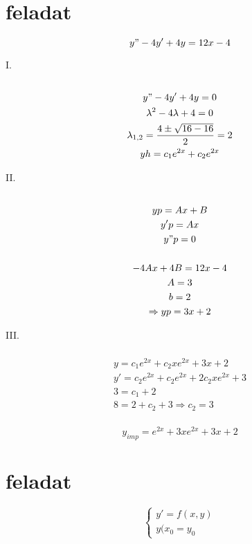 \documentclass{article}
\begin{document}
\section{feladat}

\begin{equation}
y"-4y'+4y=12x-4      
\end{equation}

I.
\begin{multline}
\\
y"-4y'+4y=0 \\
\lambda^{2}-4\lambda+4 = 0 \\
\lambda_{1,2} = \frac{4\pm \sqrt{16-16}}{2}=2 \\
yh= c_{1} e^{2x}+c_{2} e^{2x} \\
\end{multline}

II.
\begin{multline}
\\
yp = Ax+B \\
y'p = Ax \\
y"p = 0 \\
\\
-4Ax+4B = 12x-4 \\
A = 3 \\
b = 2 \\
\Rightarrow yp = 3x+2
\end{multline}

III.

\begin{multline}
\\
y = c_{1}e^{2x}+c_{2}xe^{2x}+3x+2 \\
y' = c_{2}e^{2x}+c_{2}e^{2x}+2c_{2}xe^{2x}+3 \\
3 = c_{1}+2 \\
8 = 2+c_{2}+3 \Rightarrow c_{2}=3 \\
\end{multline}

\begin{equation}
y_{imp} = e^{2x}+3xe^{2x}+3x+2
\end{equation}

\section{feladat}

\begin{equation}
   \begin{cases}
    y' = f(x,y) \\
    y(x_{0}=y_{0}
    \end{cases}
\end{equation}
\end{document}
